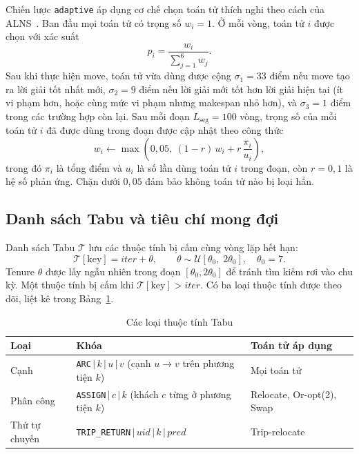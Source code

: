 \documentclass[../DoAn.tex]{subfiles}
\begin{document}
Chiến lược \texttt{adaptive} áp dụng cơ chế chọn toán tử thích nghi theo cách của ALNS~\cite{ropke2006adaptive}. Ban đầu mọi toán tử có trọng số $w_i = 1$. Ở mỗi vòng, toán tử $i$ được chọn với xác suất
\begin{equation}
p_i = \frac{w_i}{\sum_{j=1}^{6} w_j}.
\end{equation}
Sau khi thực hiện move, toán tử vừa dùng được cộng $\sigma_1 = 33$ điểm nếu move tạo ra lời giải tốt nhất mới, $\sigma_2 = 9$ điểm nếu lời giải mới tốt hơn lời giải hiện tại (ít vi phạm hơn, hoặc cùng mức vi phạm nhưng makespan nhỏ hơn), và $\sigma_3 = 1$ điểm trong các trường hợp còn lại. Sau mỗi đoạn $L_{\text{seg}} = 100$ vòng, trọng số của mỗi toán tử $i$ đã được dùng trong đoạn được cập nhật theo công thức
\begin{equation}
w_i \leftarrow \max\!\left(0{,}05,\ (1 - r)\, w_i + r\, \frac{\pi_i}{u_i}\right),
\end{equation}
trong đó $\pi_i$ là tổng điểm và $u_i$ là số lần dùng toán tử $i$ trong đoạn, còn $r = 0{,}1$ là hệ số phản ứng. Chặn dưới $0{,}05$ đảm bảo không toán tử nào bị loại hẳn.

\subsection{Danh sách Tabu và tiêu chí mong đợi}
\label{subsec:tabu}

Danh sách Tabu $\mathcal{T}$ lưu các thuộc tính bị cấm cùng vòng lặp hết hạn:
\begin{equation}
\mathcal{T}[\text{key}] = \mathit{iter} + \theta, \qquad \theta \sim \mathcal{U}[\theta_0,\; 2\theta_0], \quad \theta_0 = 7.
\end{equation}
Tenure $\theta$ được lấy ngẫu nhiên trong đoạn $[\theta_0, 2\theta_0]$ để tránh tìm kiếm rơi vào chu kỳ. Một thuộc tính bị cấm khi $\mathcal{T}[\text{key}] > \mathit{iter}$. Có ba loại thuộc tính được theo dõi, liệt kê trong Bảng~\ref{tab:tabu_attrs}.

\begin{table}[H]
\centering
\caption{Các loại thuộc tính Tabu}
\label{tab:tabu_attrs}
\begin{tabular}{lll}
\toprule
\textbf{Loại} & \textbf{Khóa} & \textbf{Toán tử áp dụng} \\
\midrule
Cạnh          & \texttt{ARC}$\,|\,k\,|\,u\,|\,v$ (cạnh $u\!\to\!v$ trên phương tiện $k$) & Mọi toán tử \\
Phân công     & \texttt{ASSIGN}$\,|\,c\,|\,k$ (khách $c$ từng ở phương tiện $k$)       & Relocate, Or-opt(2), Swap \\
Thứ tự chuyến & \texttt{TRIP\_RETURN}$\,|\,\mathit{uid}\,|\,k\,|\,\mathit{pred}$      & Trip-relocate \\
\bottomrule
\end{tabular}
\end{table}
\end{document}
